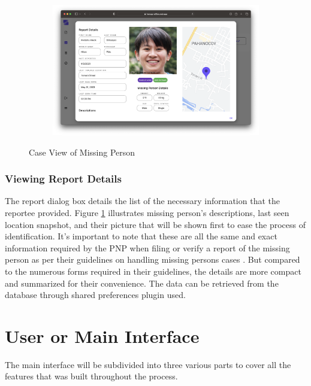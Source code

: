 \begin{figure}[!h]
    \centering
    \begin{subfigure}[c]{1\linewidth}
        \centering
        \includegraphics[scale=0.25]{figures/Chapter4/PNP/CaseView-1.png}
    \end{subfigure}
    \caption{Case View of Missing Person}
    \label{fig:reportDetails}
\end{figure}

\subsubsection{Viewing Report Details}

The report dialog box details the list of the necessary information that the reportee provided. Figure \ref{fig:reportDetails} illustrates missing person's descriptions, last seen location snapshot, and their picture that will be shown first to ease the process of identification. It's important to note that these are all the same and exact information required by the PNP when filing or verify a report of the missing person as per their guidelines on handling missing persons cases \cite{NationalPoliceCommission}. But compared to the numerous forms required in their guidelines, the details are more compact and summarized for their convenience. The data can be retrieved from the database through shared preferences plugin used.

\section{User or Main Interface}
The main interface will be subdivided into three various parts to cover all the features that was built throughout the process.

